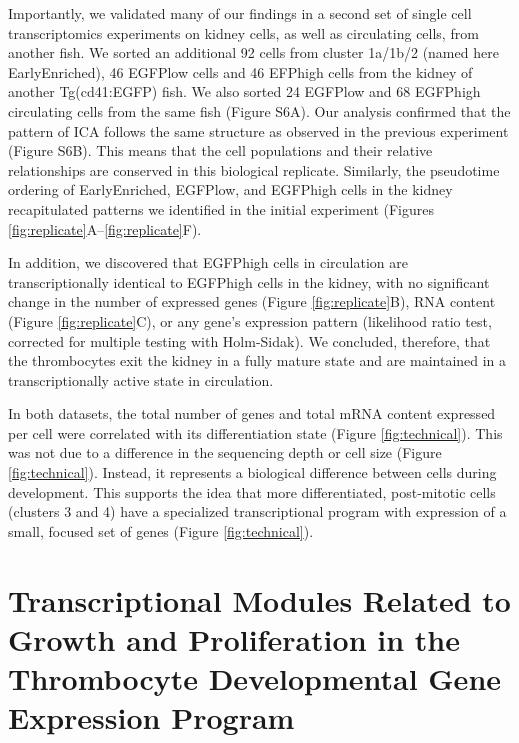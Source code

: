 Importantly, we validated many of our findings in a second set of single cell transcriptomics experiments on kidney cells, as well as circulating cells, from another fish. We sorted an additional 92 cells from cluster 1a/1b/2 (named here EarlyEnriched), 46 EGFPlow cells and 46 EFPhigh cells from the kidney of another Tg(cd41:EGFP) fish. We also sorted 24 EGFPlow and 68 EGFPhigh circulating cells from the same fish (Figure S6A). Our analysis confirmed that the pattern of ICA follows the same structure as observed in the previous experiment (Figure S6B). This means that the cell populations and their relative relationships are conserved in this biological replicate. Similarly, the pseudotime ordering of EarlyEnriched, EGFPlow, and EGFPhigh cells in the kidney recapitulated patterns we identified in the initial experiment (Figures \ref{fig:replicate}A–\ref{fig:replicate}F).

In addition, we discovered that EGFPhigh cells in circulation are transcriptionally identical to EGFPhigh cells in the kidney, with no significant change in the number of expressed genes (Figure \ref{fig:replicate}B), RNA content (Figure \ref{fig:replicate}C), or any gene’s expression pattern (likelihood ratio test, corrected for multiple testing with Holm-Sidak). We concluded, therefore, that the thrombocytes exit the kidney in a fully mature state and are maintained in a transcriptionally active state in circulation.

In both datasets, the total number of genes and total mRNA content expressed per cell were correlated with its differentiation state (Figure \ref{fig:technical}). This was not due to a difference in the sequencing depth or cell size (Figure \ref{fig:technical}). Instead, it represents a biological difference between cells during development. This supports the idea that more differentiated, post-mitotic cells (clusters 3 and 4) have a specialized transcriptional program with expression of a small, focused set of genes (Figure \ref{fig:technical}).

\section{Transcriptional Modules Related to Growth and Proliferation in the Thrombocyte Developmental Gene Expression Program}

